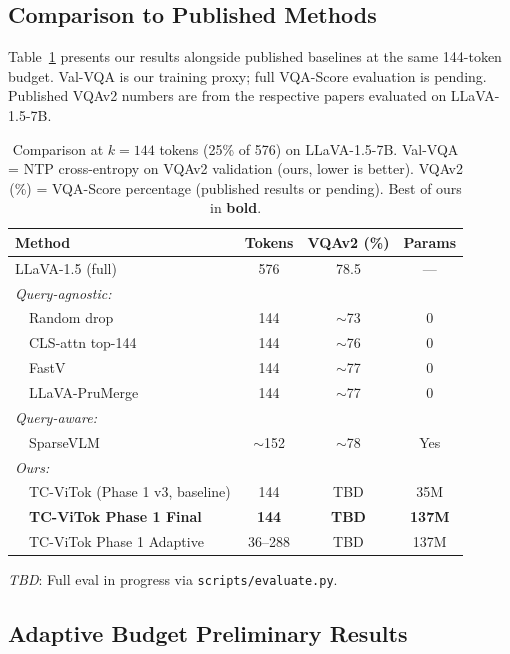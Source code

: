 \documentclass{article}
\begin{document}
\subsection{Comparison to Published Methods}
\label{sec:comparison}

Table~\ref{tab:main} presents our results alongside published baselines at the same
144-token budget.
Val-VQA is our training proxy; full VQA-Score evaluation is pending.
Published VQAv2 numbers are from the respective papers evaluated on LLaVA-1.5-7B.

\begin{table}[t]
\caption{Comparison at $k{=}144$ tokens (25\% of 576) on LLaVA-1.5-7B. Val-VQA =
NTP cross-entropy on VQAv2 validation (ours, lower is better). VQAv2 (\%) = VQA-Score
percentage (published results or pending). Best of ours in \textbf{bold}.}
\label{tab:main}
\vskip 0.1in
\centering
\begin{small}
\begin{tabular}{lccc}
\toprule
\textbf{Method} & \textbf{Tokens} & \textbf{VQAv2 (\%)} & \textbf{Params} \\
\midrule
LLaVA-1.5 (full)                & 576 & 78.5 & — \\
\midrule
\emph{Query-agnostic:} \\
~~Random drop                   & 144 & $\sim$73 & 0 \\
~~CLS-attn top-144              & 144 & $\sim$76 & 0 \\
~~FastV~\cite{chen2024fastv}    & 144 & $\sim$77 & 0 \\
~~LLaVA-PruMerge~\cite{shang2024llava} & 144 & $\sim$77 & 0 \\
\midrule
\emph{Query-aware:} \\
~~SparseVLM~\cite{zhang2025sparsevlm} & $\sim$152 & $\sim$78 & Yes \\
\midrule
\emph{Ours:} \\
~~TC-ViTok (Phase 1 v3, baseline) & 144 & TBD & 35M \\
~~\textbf{TC-ViTok Phase 1 Final} & \textbf{144} & \textbf{TBD} & \textbf{137M} \\
~~TC-ViTok Phase 1 Adaptive      & 36–288 & TBD & 137M \\
\bottomrule
\end{tabular}
\end{small}
\vskip -0.05in
\small{\textit{TBD}: Full eval in progress via \texttt{scripts/evaluate.py}.}
\end{table}

\subsection{Adaptive Budget Preliminary Results}
\end{document}
